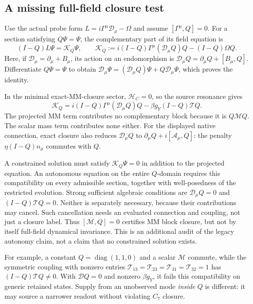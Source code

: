 \documentclass[11pt,a4paper]{article}
\begin{document}
\subsection{A missing full-field closure test}

Use the actual probe form $L=i\Gamma^\mu\mathcal D_\mu-\Omega$ and
assume $[\Gamma^\mu,Q]=0$. For a section satisfying $Q\Psi=\Psi$,
the complementary part of its field equation is
\[
 (I-Q)L\Psi=\mathcal K_Q\Psi,
 \qquad
 \mathcal K_Q:=i(I-Q)\Gamma^\mu(\mathcal D_\mu Q)Q
                 -(I-Q)\Omega Q.
\]
Here, if $\mathcal D_\mu=\partial_\mu+B_\mu$, its action on an
endomorphism is $\mathcal D_\mu Q=\partial_\mu Q+[B_\mu,Q]$.
Differentiate $Q\Psi=\Psi$ to obtain
$\mathcal D_\mu\Psi=(\mathcal D_\mu Q)\Psi+
Q\mathcal D_\mu\Psi$, which proves the identity.

In the minimal exact-MM-closure sector, $\mathcal H_C=0$, so the
source resonance gives
\[
 \boxed{\displaystyle
 \mathcal K_Q=
 i(I-Q)\Gamma^\mu(\mathcal D_\mu Q)Q
 -\beta g_Y(I-Q)\mathcal T Q.}
\]
The projected MM term contributes no complementary block because
it is $Q\mathcal M Q$. The scalar mass term contributes none either.
For the displayed native connection, exact closure also reduces
$\mathcal D_\mu Q$ to
$\partial_\mu Q+i[\mathcal A_\mu,Q]$: the penalty
$\eta(I-Q)n_\mu$ commutes with $Q$.

A constrained solution must satisfy $\mathcal K_Q\Psi=0$ in
addition to the projected equation. An autonomous equation on the
entire $Q$-domain requires this compatibility on every admissible
section, together with well-posedness of the restricted evolution.
Strong sufficient algebraic conditions are
$\mathcal D_\mu Q=0$ and $(I-Q)\mathcal T Q=0$. Neither is separately
necessary, because their contributions may cancel. Such cancellation
needs an evaluated connection and coupling, not just a closure label.
Thus $[\mathcal M,Q]=0$ certifies MM block closure, but not by itself
full-field dynamical invariance. This is an additional audit of the
legacy autonomy claim, not a claim that no constrained solution exists.

For example, a constant $Q=\operatorname{diag}(1,1,0)$ and a scalar
$\mathcal M$ commute, while the symmetric coupling with nonzero
entries $\mathcal T_{13}=\mathcal T_{23}=
\mathcal T_{31}=\mathcal T_{32}=1$ has
$(I-Q)\mathcal T Q\ne0$. With $\mathcal DQ=0$ and nonzero
$\beta g_Y$, it fails this compatibility on generic retained states.
Supply from an unobserved mode \emph{inside} $Q$ is different:
it may source a narrower readout without violating $C_7$ closure.
\end{document}
